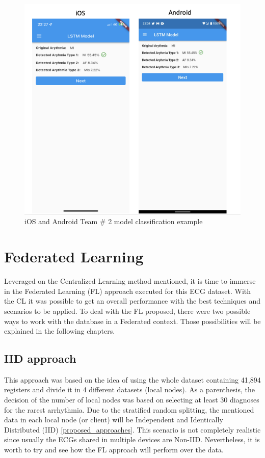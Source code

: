 \begin{figure}[H]
\centering
\includegraphics[scale=0.4]{img/lstm_deployment.png}
\caption{iOS and Android Team \# 2 model classification example}
\label{dnn_deloyment}
\end{figure}




\section{Federated Learning} \label{5FL}

Leveraged on the Centralized Learning method mentioned, it is time to immerse in the Federated Learning (FL) approach executed for this ECG dataset. With the CL it was possible to get an overall performance with the best techniques and scenarios to be applied. To deal with the FL proposed, there were two possible ways to work with the database in a Federated context. Those possibilities will be explained in the following chapters.

\subsection{IID approach}

This approach was based on the idea of using the whole dataset containing 41,894 registers and divide it in 4 different datasets (local nodes). As a parenthesis, the decision of the number of local nodes was based on selecting at least 30 diagnoses for the rarest arrhythmia. Due to the stratified random splitting, the mentioned data in each local node (or client) will be Independent and Identically Distributed (IID) \ref{proposed_approaches}. This scenario is not completely realistic since usually the ECGs shared in multiple devices are Non-IID. Nevertheless, it is worth to try and see how the FL approach will perform over the data.

